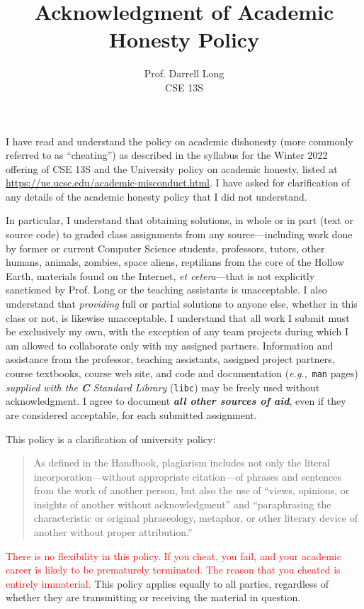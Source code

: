 \documentclass[11pt]{article}
\title{Acknowledgment of Academic Honesty Policy}
\author{Prof.\xspace Darrell Long \\
CSE 13S}
\date{\quarter}
\newcommand{\surl}[1]{{\fontsize{9}{11}\selectfont\url{#1}}}
\newcommand{\quarter}{Winter 2022}
\begin{document}
\maketitle

I have read and understand the policy on academic dishonesty (more
commonly referred to as ``cheating'') as described in the syllabus for
the \quarter{} offering of CSE 13S and the University policy on academic
honesty, listed at \surl{https://ue.ucsc.edu/academic-misconduct.html}.
I have asked for clarification of any details of the academic honesty
policy that I did not understand.

In particular, I understand that obtaining solutions, in whole or in
part (text or source code) to graded class assignments from any
source---including work done by former or current Computer Science
students, professors, tutors, other humans, animals, zombies, space
aliens, reptilians from the core of the Hollow Earth, materials found on
the Internet, \emph{et cetera}---that is not explicitly sanctioned by
Prof.\xspace Long or the teaching assistants is unacceptable. I also
understand that \emph{providing} full or partial solutions to anyone
else, whether in this class or not, is likewise unacceptable. I
understand that all work I submit must be exclusively my own, with the
exception of any team projects during which I am allowed to collaborate
only with my assigned partners.  Information and assistance from the
professor, teaching assistants, assigned project partners, course
textbooks, course web site, and code and documentation
(\emph{e.g.},~\texttt{man} pages) \emph{supplied with the \textbf{C}
Standard Library} (\texttt{libc}) may be freely used without
acknowledgment.  I agree to document \textbf{\emph{all other sources of
aid}}, even if they are considered acceptable, for each submitted
assignment.

This policy is a clarification of university policy: \begin{quote} As
  defined in the Handbook, plagiarism includes not only the literal
  incorporation---without appropriate citation---of phrases and
  sentences from the work of another person, but also the use of
  ``views, opinions, or insights of another without acknowledgment'' and
  ``paraphrasing the characteristic or original phraseology, metaphor,
  or other literary device of another without proper attribution.''
\end{quote}


\textcolor{red}{There is no flexibility in this policy. If you cheat,
you fail, and your academic career is likely to be prematurely
terminated. The reason that you cheated is entirely immaterial.} This
policy applies equally to all parties, regardless of whether they are
transmitting or receiving the material in question.
\end{document}
